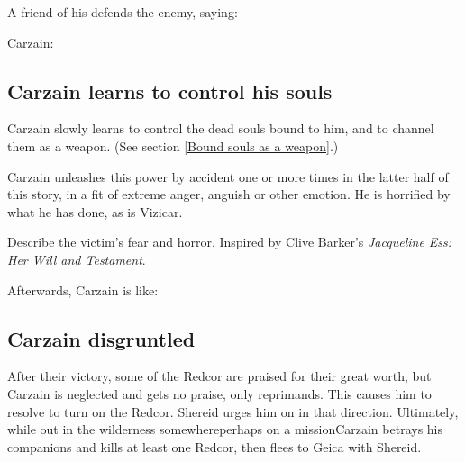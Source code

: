 A friend of his defends the enemy, saying: 

Carzain: 







\subsection{Carzain learns to control his souls}
Carzain slowly learns to control the dead souls bound to him, and to channel them as a weapon. (See section \ref{Bound souls as a weapon}.)

Carzain unleashes this power by accident one or more times in the latter half of this story, in a fit of extreme anger, anguish or other emotion. He is horrified by what he has done, as is Vizicar. 

Describe the victim's fear and horror. Inspired by Clive Barker's \emph{Jacqueline Ess: Her Will and Testament}. 

Afterwards, Carzain is like: 







\subsection{Carzain disgruntled}
After their victory, some of the Redcor are praised for their great worth, but Carzain is neglected and gets no praise, only reprimands. This causes him to resolve to turn on the Redcor. Shereid urges him on in that direction. Ultimately, while out in the wilderness somewhere\dash perhaps on a mission\dash Carzain betrays his \Redcean{} companions and kills at least one Redcor, then flees to Geica with Shereid. 


